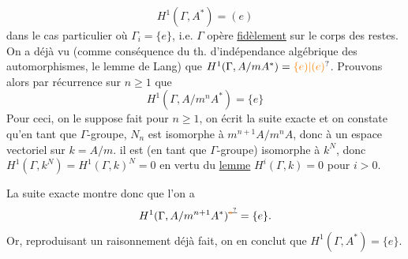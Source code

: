 \[
H^1(\Gamma,A^*)=(e)
\]
 dans le cas particulier où $\Gamma_i=\{e\}$,
i.e. $\Gamma$ opère \uline{fidèlement} sur le corps des restes. On a déjà vu (comme conséquence du th. d'indépendance algébrique des automorphismes,  le lemme de Lang) que $H^1(\Gamma,A/mA^*)=\unsure{\{e)|(e)}$. Prouvons alors par récurrence sur $n\geq1$ que
\[
H^1(\Gamma,A/m^n A^*)=\{e\}
\]
Pour ceci, on  le suppose fait pour $n\geq1$, on écrit la suite exacte
et on constate qu'en tant que $\Gamma$-groupe, $N_n$ est isomorphe à $m^{n+1}A/m^n A$, donc à un espace vectoriel sur $k=A/m$.  il est (en tant que $\Gamma$-groupe) isomorphe à $k^N$, donc $H^1(\Gamma,k^N)=H^1(\Gamma,k)^N=0$ en vertu du \uline{lemme} $H^i(\Gamma,k)=0$ pour $i>0$.

La suite exacte
montre donc que l'on a
\[
H^1(\Gamma,A/m^{n+1}A^*)^{\deleted{\unsure{*}}}=\{e\}.
\]
Or, reproduisant un raisonnement déjà fait, on en conclut que $H^1(\Gamma,A^*)=\{e\}$.


